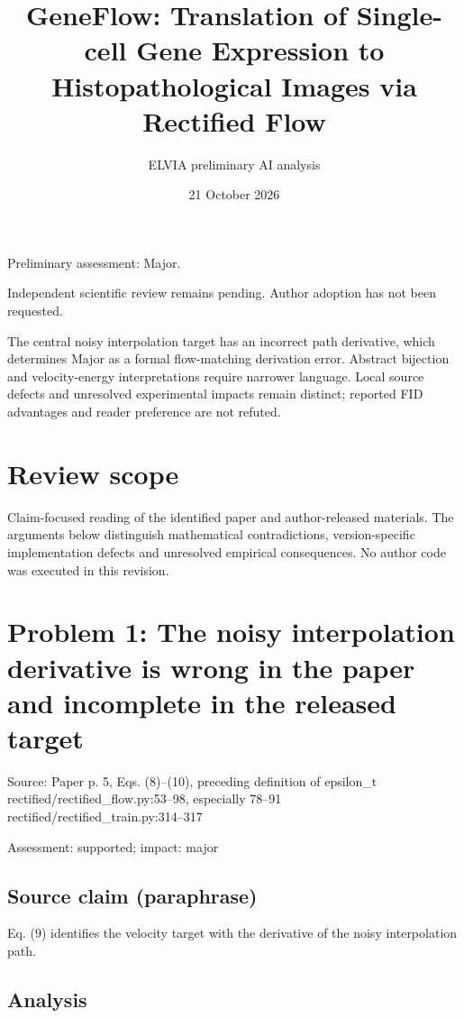 \documentclass[11pt]{article}
\begin{document}
\title{GeneFlow: Translation of Single-cell Gene Expression to Histopathological Images via Rectified Flow}

\author{ELVIA preliminary AI analysis}\date{21 October 2026}\maketitle

Preliminary assessment: Major.\par

Independent scientific review remains pending. Author adoption has not been requested.

The central noisy interpolation target has an incorrect path derivative, which determines Major as a formal flow-matching derivation error. Abstract bijection and velocity-energy interpretations require narrower language. Local source defects and unresolved experimental impacts remain distinct; reported FID advantages and reader preference are not refuted.

\section*{Review scope}

Claim-focused reading of the identified paper and author-released materials. The arguments below distinguish mathematical contradictions, version-specific implementation defects and unresolved empirical consequences. No author code was executed in this revision.

\section*{Problem 1: The noisy interpolation derivative is wrong in the paper and incomplete in the released target}

Source: Paper p. 5, Eqs. (8)–(10), preceding definition of epsilon\_t rectified/rectified\_flow.py:53–98, especially 78–91 rectified/rectified\_train.py:314–317

Assessment: supported; impact: major

\subsection*{Source claim (paraphrase)}

Eq. (\(9\)) identifies the velocity target with the derivative of the noisy interpolation path.

\subsection*{Analysis}
\end{document}
